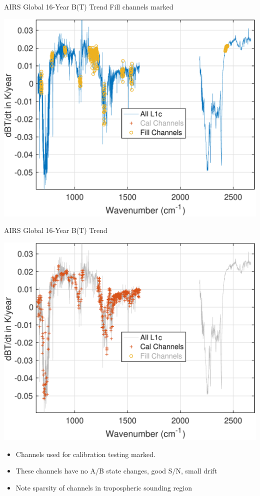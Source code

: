 \documentclass[10pt,t]{beamer}
\begin{document}
\begin{frame}[label={sec:org7c679e3}]{AIRS Global 16-Year B(T) Trend}
Fill channels marked

\begin{center}
\includegraphics[width=0.85\linewidth]{./Figs/Pdf/rand_global_trend_l1c_overview_fill_marked.pdf}
\end{center}
\end{frame}

\begin{frame}[label={sec:org58f8280}]{AIRS Global 16-Year B(T) Trend}
\vspace{-0.1in}

\begin{center}
\includegraphics[width=0.75\linewidth]{./Figs/Pdf/rand_global_trend_l1c_overview_calfit_marked.pdf}
\end{center}

\vspace{-0.15in}
\begin{footnotesize}
\begin{itemize}
\item Channels used for calibration testing marked.
\item These channels have no A/B state changes, good S/N, small drift
\item Note sparsity of \cd channels in tropospheric sounding region
\end{itemize}
\end{footnotesize}
\end{frame}
\end{document}
